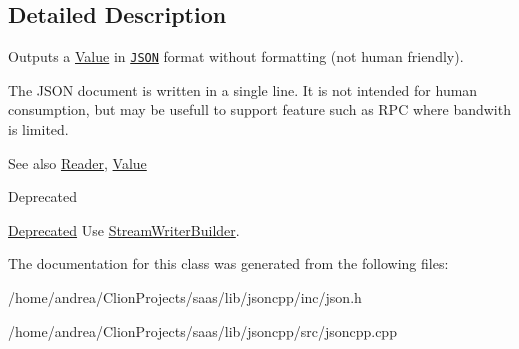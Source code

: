 \subsection{Detailed Description}
Outputs a \hyperlink{class_json_1_1_value}{Value} in \href{http://www.json.org}{\tt J\+S\+ON} format without formatting (not human friendly). 

The J\+S\+ON document is written in a single line. It is not intended for \textquotesingle{}human\textquotesingle{} consumption, but may be usefull to support feature such as R\+PC where bandwith is limited. \begin{DoxySeeAlso}{See also}
\hyperlink{class_json_1_1_reader}{Reader}, \hyperlink{class_json_1_1_value}{Value} 
\end{DoxySeeAlso}
\begin{DoxyRefDesc}{Deprecated}
\item[\hyperlink{deprecated__deprecated000008}{Deprecated}]Use \hyperlink{class_json_1_1_stream_writer_builder}{Stream\+Writer\+Builder}. \end{DoxyRefDesc}


The documentation for this class was generated from the following files\+:\begin{DoxyCompactItemize}
\item 
/home/andrea/\+Clion\+Projects/saas/lib/jsoncpp/inc/json.\+h\item 
/home/andrea/\+Clion\+Projects/saas/lib/jsoncpp/src/jsoncpp.\+cpp\end{DoxyCompactItemize}

